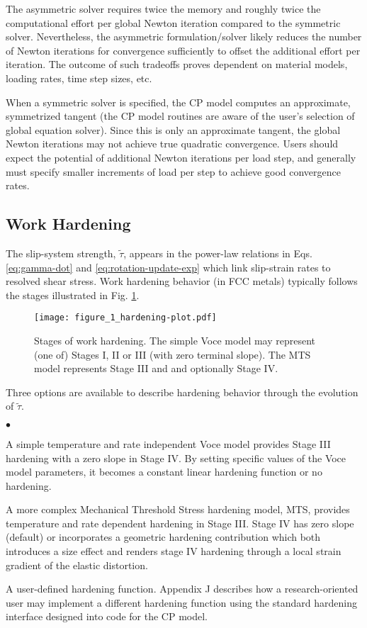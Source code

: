 \documentclass[11pt]{report}
\numberwithin{equation}{section}
\newcommand{\noi}{\noindent}
\newcommand{\squishlist}{
 \begin{list}{$\bullet$}
  { \setlength{\itemsep}{0pt}
     \setlength{\parsep}{3pt}
     \setlength{\topsep}{3pt}
     \setlength{\partopsep}{0pt}
     \setlength{\leftmargin}{1.5em}
     \setlength{\labelwidth}{1em}
     \setlength{\labelsep}{0.5em} } }
\newcommand{\squishend}{
  \end{list}  }
\begin{document}
The asymmetric solver requires twice the memory and roughly twice the computational effort
per global Newton iteration compared to the symmetric solver. Nevertheless, the asymmetric
formulation/solver likely reduces the number of
Newton iterations for convergence sufficiently to offset the additional effort per iteration. 
The outcome of such tradeoffs proves dependent on material models, loading rates,
time step sizes, etc.

When a symmetric solver is specified, the CP model
computes an approximate, symmetrized tangent (the CP model routines are aware of the user's
selection of global equation solver).
Since this is only an approximate
tangent, the global Newton iterations may not achieve true quadratic convergence.
Users should expect the potential of additional Newton iterations per load step, 
and generally must specify 
smaller increments of load per step to achieve good convergence rates.




\subsection{Work Hardening}

The  slip-system strength, $\tilde{\tau}$,  appears in the power-law 
relations in Eqs. \ref{eq:gamma-dot}
and \ref{eq:rotation-update-exp} which link slip-strain rates to resolved shear stress.
Work hardening behavior (in FCC metals) typically follows the stages illustrated in Fig.
\ref{fig:stages-hardening}.
\begin{figure}
\begin{centering}
\texttt{[image: figure\_1\_hardening-plot.pdf]}
\par\end{centering}

\caption{\small Stages of work hardening.  The simple Voce model may
represent (one of) Stages I, II or III (with zero terminal slope). The MTS model represents Stage 
III and and optionally Stage IV.
\normalsize \label{fig:stages-hardening}} 
\end{figure} 


\noi Three options are available to describe hardening behavior through the 
evolution of $\tilde \tau$. 

\small
\squishlist
\item 
A simple temperature and rate independent Voce model
provides Stage III hardening with a zero slope in Stage IV.  By setting specific values
of the Voce model parameters, it becomes a constant linear hardening function or no hardening.
\item
A more complex Mechanical Threshold Stress \cite{FK88} hardening model, MTS, provides
temperature and rate dependent hardening in Stage III.  Stage IV has
zero slope (default) or incorporates a geometric
hardening contribution which both introduces a size effect and 
renders stage IV hardening through a local strain gradient of the elastic distortion.
\item 
A user-defined hardening function. Appendix J describes how a research-oriented user
may implement a different hardening function using the standard hardening interface 
designed into code for the CP model.
\squishend
\normalsize
\end{document}
